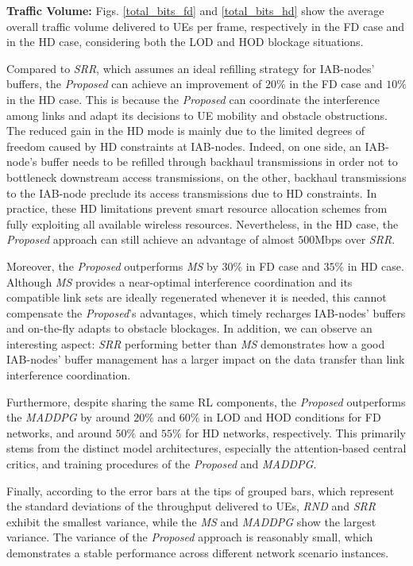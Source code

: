 \textbf{Traffic Volume:}
Figs. \ref{total_bits_fd} and \ref{total_bits_hd} show the average overall traffic volume delivered to UEs per frame, respectively in the FD case and in the HD case, considering both the LOD and HOD blockage situations.

Compared to \textit{SRR}, which assumes an ideal refilling strategy for IAB-nodes' buffers, the \textit{Proposed} can achieve an improvement of $20\%$ in the FD case and $10\%$ in the HD case. This is because the \textit{Proposed} can coordinate the interference among links and adapt its decisions to UE mobility and obstacle obstructions. The reduced gain in the HD mode is mainly due to the limited degrees of freedom caused by HD constraints at IAB-nodes.
Indeed, on one side, an IAB-node's buffer needs to be refilled through backhaul transmissions in order not to bottleneck downstream access transmissions, on the other, backhaul transmissions to the IAB-node preclude its access transmissions due to HD constraints.
In practice, these HD limitations prevent smart resource allocation schemes from fully exploiting all available wireless resources.
Nevertheless, in the HD case, the \textit{Proposed} approach can still achieve an advantage of almost $500$Mbps over \textit{SRR}.

Moreover, the \textit{Proposed} outperforms \textit{MS} by $30\%$ in FD case and $35\%$ in HD case. Although \textit{MS} provides a near-optimal interference coordination and its compatible link sets are ideally regenerated whenever it is needed, this cannot compensate the \textit{Proposed}'s advantages, which timely recharges IAB-nodes' buffers and on-the-fly adapts to obstacle blockages. In addition, we can observe an interesting aspect: \textit{SRR} performing better than \textit{MS} demonstrates how a good IAB-nodes' buffer management has a larger impact on the data transfer than link interference coordination.


Furthermore, despite sharing the same RL components, the \textit{Proposed} outperforms the \textit{MADDPG} by around $20\%$ and $60\%$ in LOD and HOD conditions for FD networks, and around $50\%$ and $55\%$ for HD networks, respectively. This primarily stems from the distinct model architectures, especially the attention-based central critics, and training procedures of the \textit{Proposed} and \textit{MADDPG}.



Finally, according to the error bars at the tips of grouped bars, which represent the standard deviations of the throughput delivered to UEs, \textit{RND} and \textit{SRR} exhibit the smallest variance, while the \textit{MS} and \textit{MADDPG} show the largest variance. The variance of the \textit{Proposed} approach is reasonably small, which demonstrates a stable performance across different network scenario instances.


